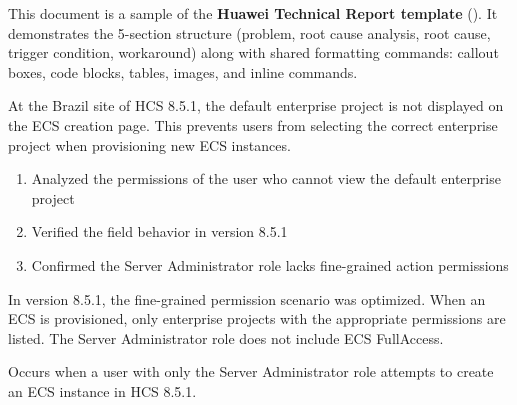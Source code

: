 \documentclass{technical}
\begin{document}
\makecover
\maketoc
\startbody

\begin{infobox}
This document is a sample of the \textbf{Huawei Technical Report template} ().
It demonstrates the 5-section structure (problem, root cause analysis, root cause, trigger condition, workaround)
along with shared formatting commands: callout boxes, code blocks, tables, images, and inline commands.
\end{infobox}

\begin{problem}
At the Brazil site of HCS 8.5.1, the default enterprise project
is not displayed on the ECS creation page. This prevents users from
selecting the correct enterprise project when provisioning new ECS
instances.
\end{problem}

\begin{rootcauseanalysis}
\begin{enumerate}
  \item Analyzed the permissions of the user who cannot view the
    default enterprise project
  \item Verified the  field behavior in version 8.5.1
  \item Confirmed the Server Administrator role lacks fine-grained
    action permissions
\end{enumerate}
\end{rootcauseanalysis}

\begin{rootcause}
In version 8.5.1, the fine-grained permission scenario was optimized.
When an ECS is provisioned, only enterprise projects with the appropriate
permissions are listed. The Server Administrator role does not include
ECS FullAccess.
\end{rootcause}

\begin{triggercondition}
Occurs when a user with only the Server Administrator role attempts
to create an ECS instance in HCS 8.5.1.
\end{triggercondition}
\end{document}

